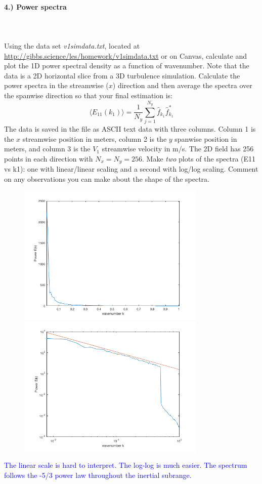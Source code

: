 \documentclass[11pt]{article}
\begin{document}
\paragraph{4.) Power spectra}~\\\\
Using the data set \textit{v1simdata.txt}, located at \href{http://gibbs.science/les/homework/v1simdata.txt}{http://gibbs.science/les/homework/v1simdata.txt} or on Canvas, calculate and plot the 1D power spectral density as a function of wavenumber. Note that the data is a 2D horizontal slice from a 3D turbulence simulation. Calculate the power spectra in the streamwise ($x$) direction and then average the spectra over the spanwise direction so that your final estimation is:
$$\langle E_{11}(k_1) \rangle = \frac{1}{N_y} \sum_{j=1}^{N_y} \hat f_{k_1} \hat f^*_{k_1}$$
The data is saved in the file as ASCII text data with three columns. Column 1 is the $x$ streamwise position in meters, column 2 is the $y$ spanwise position in meters, and column 3 is the $V_1$ streamwise velocity in m/s. The 2D field has 256 points in each direction with $N_x = N_y = 256$. Make \textit{two} plots of the spectra (E11 vs k1): one with linear/linear scaling and a second with log/log scaling. Comment on any observations you can make about the shape of the spectra.
\begin{figure}[H]
	\centering
	\includegraphics[width=0.8\textwidth]{spectra_linear}
	\includegraphics[width=0.8\textwidth]{spectra}
	\end{figure}
	\textcolor{blue}{The linear scale is hard to interpret. The log-log is much easier. The spectrum follows the -5/3 power law throughout the inertial subrange.}
\end{document}
